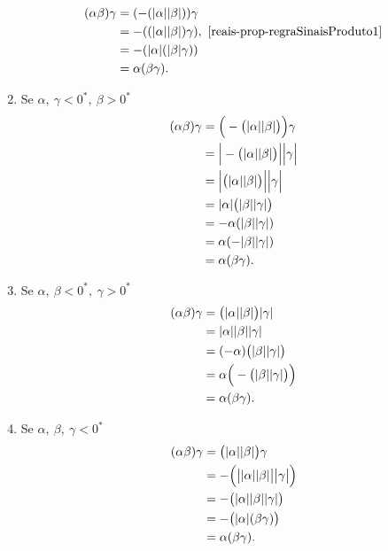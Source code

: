 \documentclass[../main.tex]{subfiles}
\begin{document}
\begin{dem}
\begin{enumerate}
            \begin{align*}
                 (\alpha\beta)\gamma 
                 &= (-(\abs{\alpha}\abs{\beta}))\gamma \\
                 &= -((\abs{\alpha}\abs{\beta})\gamma), \text{ \Cref{reais-prop-regraSinaisProduto1}} \\
                 &= -(\abs{\alpha}(\abs{\beta}\gamma)) \\
                 &= \alpha(\beta\gamma).
            \end{align*}
        \item Se $\alpha,\ \gamma < 0^*,\ \beta > 0^*$
            \begin{align*}
                (\alpha\beta)\gamma
                &= \Big( -\big(\abs{\alpha}\abs{\beta} \big) \Big)\gamma \\
                &= \Big| -\big( \abs{\alpha} \abs{\beta} \big) \Big| \Big| \gamma \Big| \\
                &= \Big| \big( \abs{\alpha} \abs{\beta} \big) \Big| \Big| \gamma \Big| \\ 
                &= \abs{\alpha} \big( \abs{\beta} \abs{\gamma} \big) \\
                &= -\alpha (\abs{\beta}\abs{\gamma}) \\
                &= \alpha(-\abs{\beta}\abs{\gamma}) \\
                &= \alpha (\beta\gamma).               
            \end{align*}       
        \item Se $\alpha,\ \beta < 0^*,\ \gamma > 0^*$
            \begin{align*}
                (\alpha\beta)\gamma
                &= \big( \abs{\alpha} \abs{\beta} \big) \abs{\gamma} \\
                &= \abs{\alpha}  \abs{\beta} \abs{\gamma} \\
                &= (-\alpha)\big(\abs{\beta}\abs{\gamma}\big) \\
                &= \alpha \Big( - \big( \abs{\beta} \abs{\gamma} \big) \Big) \\
                &= \alpha(\beta\gamma).
            \end{align*}  
        \item Se $\alpha,\ \beta,\ \gamma < 0^* $
            \begin{align*}
                (\alpha\beta)\gamma 
                &= \big(\abs{\alpha}\abs{\beta}\big)\gamma \\
                &= -\Big(\big|\abs{\alpha}\abs{\beta}\big|\big|\gamma\big|\Big) \\
                &= -\big(\abs{\alpha}\abs{\beta}\abs{\gamma}\big) \\
                &= -\big( \abs{\alpha} (\beta\gamma) \big) \\
                &= \alpha(\beta\gamma).
            \end{align*}
    \end{enumerate}
\end{dem}
\end{document}
